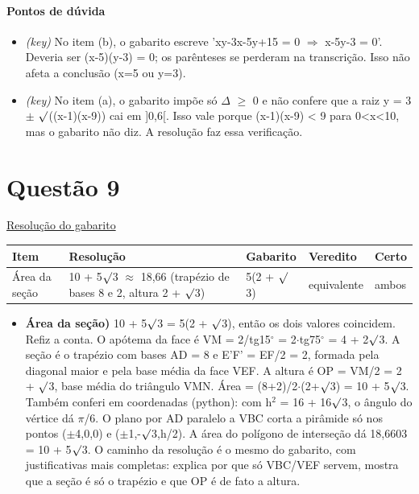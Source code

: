 \documentclass{article}%
\begin{document}
\paragraph{Pontos de dúvida}%
\begin{itemize}%
\item%
\textit{(key)} No item (b), o gabarito escreve 'xy-3x-5y+15 = 0 $\Rightarrow$ x-5y-3 = 0'. Deveria ser (x-5)(y-3) = 0; os parênteses se perderam na transcrição. Isso não afeta a conclusão (x=5 ou y=3).%
\item%
\textit{(key)} No item (a), o gabarito impõe só $\Delta$ $\geq$ 0 e não confere que a raiz y = 3 $\pm$ $\surd$((x-1)(x-9)) cai em {]}0,6{[}. Isso vale porque (x-1)(x-9) < 9 para 0<x<10, mas o gabarito não diz. A resolução faz essa verificação.%
\end{itemize}%
\section*{Questão 9}%
\href{https://poliedroresolve.sistemapoliedro.com.br/vestibulares/ita/2027/ita-2-fase-dia-1-20-10-2026-2-fase-dia-1/dissertativa-9-matematica-2-fase-dia-1-ita-2027}{Resolução do gabarito}\par\smallskip%
\begin{longtable}{@{}p{} p{} p{} p{} p{}@{}}\toprule Item & Resolução & Gabarito & Veredito & Certo \\ \midrule
Área da seção & 10 + 5$\surd$3 $\approx$ 18,66 (trapézio de bases 8 e 2, altura 2 + $\surd$3) & 5(2 + $\surd$3) & equivalente & ambos \\
\bottomrule\end{longtable}%
\begin{itemize}%
\item%
\textbf{Área da seção)} 10 + 5$\surd$3 = 5(2 + $\surd$3), então os dois valores coincidem. Refiz a conta. O apótema da face é VM = 2/tg15$^\circ$ = 2$\cdot$tg75$^\circ$ = 4 + 2$\surd$3. A seção é o trapézio com bases AD = 8 e E'F' = EF/2 = 2, formada pela diagonal maior e pela base média da face VEF. A altura é OP = VM/2 = 2 + $\surd$3, base média do triângulo VMN. Área = (8+2)/2$\cdot$(2+$\surd$3) = 10 + 5$\surd$3. Também conferi em coordenadas (python): com h$^2$ = 16 + 16$\surd$3, o ângulo do vértice dá $\pi$/6. O plano por AD paralelo a VBC corta a pirâmide só nos pontos ($\pm$4,0,0) e ($\pm$1,-$\surd$3,h/2). A área do polígono de interseção dá 18,6603 = 10 + 5$\surd$3. O caminho da resolução é o mesmo do gabarito, com justificativas mais completas: explica por que só VBC/VEF servem, mostra que a seção é só o trapézio e que OP é de fato a altura.%
\end{itemize}%
\end{document}
